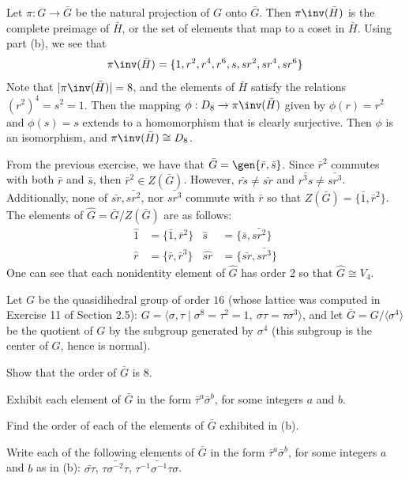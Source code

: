\begin{problems}
\begin{solalph}
        Let $\pi : G \to \bar G$ be the natural projection of $G$ onto $\bar G$. Then $\pi\inv(\bar H)$ is the complete preimage of $\bar H$, or the set of elements that map to a coset in $\bar H$. Using part (b), we see that
        \[\pi\inv(\bar H) = \{1, r^2, r^4, r^6, s, sr^2, sr^4, sr^6\}\]
        Note that $|\pi\inv(\bar H)| = 8$, and the elements of $\bar H$ satisfy the relations $(r^2)^4 = s^2 = 1$. Then the mapping $\phi : D_8 \to \pi\inv(\bar H)$ given by $\phi(r) = r^2$ and $\phi(s) = s$ extends to a homomorphism that is clearly surjective. Then $\phi$ is an isomorphism, and $\pi\inv(\bar H) \cong D_8$.
        \item From the previous exercise, we have that $\bar G = \gen{\bar r, \bar s}$. Since $\bar r^2$ commutes with both $\bar r$ and $\bar s$, then $\bar r^2 \in Z(\bar G)$. However, $\bar{rs} \neq \bar{sr}$ and $\bar{r^3s} \neq \bar{sr^3}$. Additionally, none of $\bar{sr}, \bar{sr^2}$, nor $\bar{sr^3}$ commute with $\bar r$ so that $Z(\bar G) = \{\bar 1, \bar r^2\}$. The elements of $\widehat G = \bar G/Z(\bar G)$ are as follows:
        \begin{align*}
            \hat 1 & = \{\bar 1, \bar r^2\} & \hat s & = \{\bar s, \bar{sr^2}\} \\
            \hat r & = \{\bar r, \bar r^3\} & \widehat{sr} & = \{\bar{sr}, \bar{sr^3}\}
        \end{align*}
        One can see that each nonidentity element of $\widehat G$ has order 2 so that $\widehat G \cong V_4$.
    \end{solalph}
    \item Let $G$ be the quasidihedral group of order $16$ (whose lattice was computed in Exercise 11 of Section 2.5): $G = \langle \sigma,\tau \mid \sigma^8 = \tau^2 = 1,\ \sigma\tau = \tau\sigma^3 \rangle$, and let $\bar{G} = G/\langle \sigma^4 \rangle$ be the quotient of $G$ by the subgroup generated by $\sigma^4$ (this subgroup is the center of $G$, hence is normal).
    \begin{problems}
        \item Show that the order of $\bar{G}$ is $8$.
        \item Exhibit each element of $\bar{G}$ in the form $\bar{\tau}^a \bar{\sigma}^b$, for some integers $a$ and $b$.
        \item Find the order of each of the elements of $\bar{G}$ exhibited in (b).
        \item Write each of the following elements of $\bar{G}$ in the form $\bar{\tau}^a \bar{\sigma}^b$, for some integers $a$ and $b$ as in (b): $\bar{\sigma\tau}$, $\bar{\tau\sigma^{-2}\tau}$, $\bar{\tau^{-1}\sigma^{-1}\tau\sigma}$.

\end{problems}
\end{problems}
